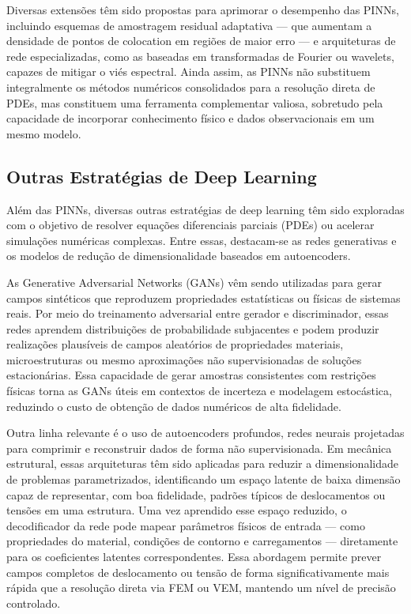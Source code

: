 \documentclass[12pt,openright,oneside,a4paper,english,brazil]{abntex2}
\begin{document}
Diversas extensões têm sido propostas para aprimorar o desempenho das PINNs, incluindo esquemas de amostragem residual adaptativa — que aumentam a densidade de pontos de colocation em regiões de maior erro \cite{lu2021} — e arquiteturas de rede especializadas, como as baseadas em transformadas de Fourier ou wavelets, capazes de mitigar o viés espectral. Ainda assim, as PINNs não 
substituem integralmente os métodos numéricos consolidados para a resolução direta de PDEs, mas constituem uma ferramenta complementar valiosa, sobretudo pela capacidade de incorporar conhecimento físico e dados observacionais em um mesmo modelo.

\subsection{Outras Estratégias de Deep Learning}

Além das PINNs, diversas outras estratégias de deep learning têm sido exploradas com o objetivo de resolver equações diferenciais parciais (PDEs) ou acelerar simulações numéricas complexas. Entre essas, destacam-se as redes generativas e os modelos de redução de dimensionalidade baseados em autoencoders.

As Generative Adversarial Networks (GANs) vêm sendo utilizadas para gerar campos sintéticos que reproduzem propriedades estatísticas ou físicas de sistemas reais. Por meio do treinamento adversarial entre gerador e discriminador, essas redes aprendem distribuições de probabilidade subjacentes e podem produzir realizações plausíveis de campos aleatórios de propriedades materiais, microestruturas 
ou mesmo aproximações não supervisionadas de soluções estacionárias. Essa capacidade de gerar amostras consistentes com restrições físicas torna as GANs úteis em contextos de incerteza e modelagem estocástica, reduzindo o custo de obtenção de dados numéricos de alta fidelidade.

Outra linha relevante é o uso de autoencoders profundos, redes neurais projetadas para comprimir e reconstruir dados de forma não supervisionada. Em mecânica estrutural, essas arquiteturas têm sido aplicadas para reduzir a dimensionalidade de problemas parametrizados, identificando um espaço latente de baixa dimensão capaz de representar, com boa fidelidade, padrões típicos de 
deslocamentos ou tensões em uma estrutura. Uma vez aprendido esse espaço reduzido, o decodificador da rede pode mapear parâmetros físicos de entrada — como propriedades do material, condições de contorno e carregamentos — diretamente para os coeficientes latentes correspondentes. Essa abordagem permite prever campos completos de deslocamento ou tensão de forma significativamente mais 
rápida que a resolução direta via FEM ou VEM, mantendo um nível de precisão controlado.
\end{document}
